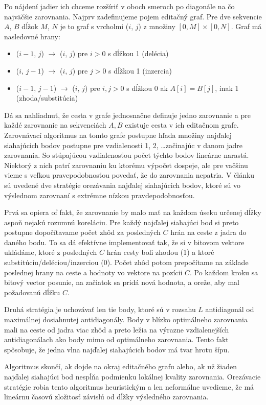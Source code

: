 Po nájdení jadier ich chceme rozšíriť v oboch smeroch po diagonále na čo najväčšie zarovnania. Najprv zadefinujeme pojem editačný graf. Pre dve sekvencie $A$, $B$ dĺžok $M$, $N$ je to graf s vrcholmi ($i$, $j$) z množiny $[0, M] \times [0, N]$. Graf má nasledovné hrany:
\begin{itemize}
\item  ($i-1$, $j$) $\longrightarrow$  ($i$, $j$) pre $i > 0$ s dĺžkou 1 (delécia)
\item  ($i$, $j - 1$) $\longrightarrow$  ($i$, $j$) pre $j > 0$ s dĺžkou 1 (inzercia)
\item  ($i - 1$, $j - 1$) $\longrightarrow$  ($i$, $j$) pre $i, j > 0$ s dĺžkou 0 ak $A[i] = B[j]$, inak 1 (zhoda/substitúcia)
\end{itemize}
Dá sa nahliadnuť, že cesta v grafe jednosnačne definuje jedno zarovnanie a pre každé zarovnanie na sekvenciách $A, B$ existuje  cesta v ich editačnom grafe. Zarovnávací algoritmus na tomto grafe postupne hľada množiny najďalej siahajúcich bodov postupne pre vzdialenosti 1, 2, \dots začinajúc v danom jadre zarovnania. So stúpajúcou vzdialenosťou počet týchto bodov lineárne narastá. Niektorý z nich patrí zarovnaniu ku ktorému výpočet dospeje, ale pre vačšinu vieme s veľkou pravepodobnosťou povedať, že do zarovnania nepatria. V článku sú uvedené dve stratégie orezávania najďalej siahajúcich bodov, ktoré sú vo výslednom zarovnaní s extrémne nízkou pravdepodobnosťou. 

Prvá sa opiera of fakt, že zarovnanie by malo mať na každom úseku určenej dĺžky aspoň nejakú rozumnú koreláciu. Pre každý najďalej siahajúci bod si preto postupne dopočítavame počet zhôd za posledných $C$ hrán na ceste z jadra do daného bodu. To sa dá efektívne implementovať tak, že si v bitovom vektore ukládáme, ktoré z posledných $C$ hrán cesty boli zhodou (1) a ktoré substitúciu/deléciou/inzerciou (0). Počet zhôd potom prepočítame na základe poslednej hrany na ceste a hodnoty vo vektore na pozícii $C$. Po každom kroku sa bitový vector posunie, na začiatok sa pridá nová hodnota, a oreže, aby mal požadovanú dĺžku $C$.

Druhá stratégia je uchovávať len tie body, ktoré sú v rozsahu $L$ antidiagonál od maximálnej dosiahnutej antidiagonály. Body v blízko optimálneho zarovnania mali na ceste od jadra viac zhôd a preto ležia na výrazne vzdialenejších antidiagonálach ako body mimo od optimálneho zarovnania. Tento fakt spôsobuje, že jedna vlna najďalej siahajúcich bodov má tvar hrotu šípu.

Algoritmus skončí, ak dojde na okraj editačného grafu alebo, ak už žiaden najďalej siahajúci bod nespĺňa podmienku lokálnej kvality zarovnania. Orezá\-vacie stratégie robia tento algoritmus heuristickým a len neformálne uvedieme, že má lineárnu časovú zložitosť závislú od dĺžky výsledného zarovnania.

